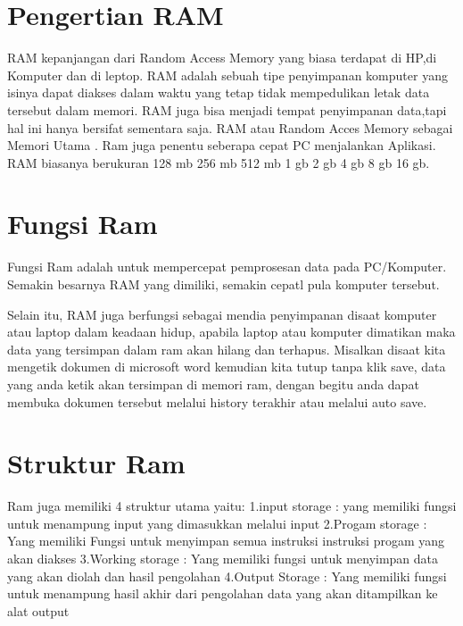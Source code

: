 \section{Pengertian RAM}
RAM kepanjangan dari Random Access Memory yang biasa terdapat di HP,di Komputer dan di leptop.
RAM adalah sebuah tipe penyimpanan komputer yang isinya dapat diakses dalam waktu yang tetap tidak mempedulikan letak data tersebut dalam memori.
RAM juga bisa menjadi tempat penyimpanan data,tapi hal ini hanya bersifat sementara saja.
RAM atau Random Acces Memory sebagai Memori Utama . Ram juga penentu seberapa cepat PC menjalankan Aplikasi.
RAM biasanya berukuran 128 mb 256 mb 512 mb 1 gb 2 gb 4 gb 8 gb 16 gb.

\section{Fungsi Ram}

Fungsi Ram adalah untuk mempercepat pemprosesan data pada PC/Komputer. 
Semakin besarnya RAM yang dimiliki, 
semakin cepatl pula komputer tersebut.

Selain itu, RAM juga berfungsi sebagai mendia penyimpanan disaat komputer atau laptop dalam keadaan hidup, 
apabila laptop atau komputer dimatikan maka data yang tersimpan dalam ram akan hilang dan terhapus. 
Misalkan disaat kita mengetik dokumen di microsoft word kemudian kita tutup tanpa klik save, 
data yang anda ketik akan tersimpan di memori ram, dengan begitu anda dapat membuka dokumen tersebut melalui history terakhir atau melalui auto save.

\section{Struktur Ram}

Ram juga memiliki 4 struktur utama yaitu:
1.input storage : yang memiliki fungsi untuk menampung input yang dimasukkan melalui input
2.Progam storage : Yang memiliki Fungsi untuk menyimpan semua instruksi instruksi progam yang akan diakses
3.Working storage : Yang memiliki fungsi untuk menyimpan data yang akan diolah dan hasil pengolahan
4.Output Storage : Yang memiliki fungsi untuk menampung hasil akhir dari pengolahan data yang akan ditampilkan ke alat output

